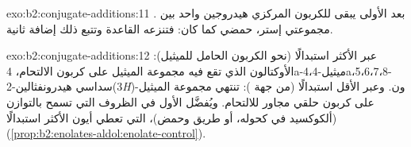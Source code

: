 \begin{solution}{exo:b2:conjugate-additions:11}
. بعد  الأولى يبقى للكربون المركزي
هيدروجين واحد بين مجموعتي إستر، حمضي كما كان: فتنزعه القاعدة وتتبع ذلك إضافة ثانية.
\end{solution}

\begin{solution}{exo:b2:conjugate-additions:12}
عبر  الأكثر استبدالًا (نحو الكربون الحامل للميثيل): الأوكتالون الذي تقع فيه مجموعة الميثيل
على كربون الالتحام، 4a-ميثيل-4،4a،5،6،7،8-سداسي هيدرونفثالين-2(3\textit{H})-ون. وعبر
 الأقل استبدالًا (من جهة ): تنتهي مجموعة الميثيل على كربون حلقي مجاور
للالتحام. ويُفضَّل الأول في الظروف التي تسمح بالتوازن (ألكوكسيد في كحوله، أو طريق
  وحمض)، التي تعطي أيون  الأكثر استبدالًا
(\cref{prop:b2:enolates-aldol:enolate-control}).
\end{solution}


